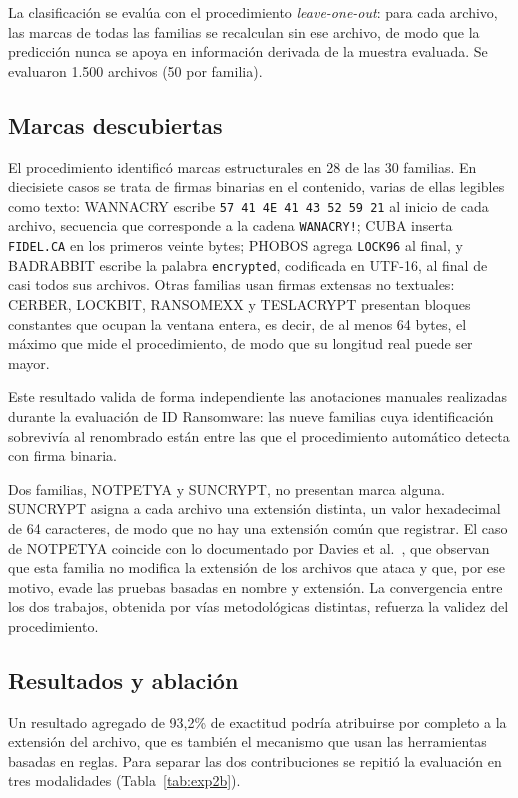 La clasificación se evalúa con el procedimiento \textit{leave-one-out}: para cada archivo, las marcas de todas las familias se recalculan sin ese archivo, de modo que la predicción nunca se apoya en información derivada de la muestra evaluada. Se evaluaron 1.500 archivos (50 por familia).

\subsection{Marcas descubiertas}

El procedimiento identificó marcas estructurales en 28 de las 30 familias. En diecisiete casos se trata de firmas binarias en el contenido, varias de ellas legibles como texto: WANNACRY escribe \texttt{57 41 4E 41 43 52 59 21} al inicio de cada archivo, secuencia que corresponde a la cadena \texttt{WANACRY!}; CUBA inserta \texttt{FIDEL.CA} en los primeros veinte bytes; PHOBOS agrega \texttt{LOCK96} al final, y BADRABBIT escribe la palabra \texttt{encrypted}, codificada en UTF-16, al final de casi todos sus archivos. Otras familias usan firmas extensas no textuales: CERBER, LOCKBIT, RANSOMEXX y TESLACRYPT presentan bloques constantes que ocupan la ventana entera, es decir, de al menos 64 bytes, el máximo que mide el procedimiento, de modo que su longitud real puede ser mayor.

Este resultado valida de forma independiente las anotaciones manuales realizadas durante la evaluación de ID Ransomware: las nueve familias cuya identificación sobrevivía al renombrado están entre las que el procedimiento automático detecta con firma binaria.

Dos familias, NOTPETYA y SUNCRYPT, no presentan marca alguna. SUNCRYPT asigna a cada archivo una extensión distinta, un valor hexadecimal de 64 caracteres, de modo que no hay una extensión común que registrar. El caso de NOTPETYA coincide con lo documentado por Davies et al.~\cite{davies2023majority}, que observan que esta familia no modifica la extensión de los archivos que ataca y que, por ese motivo, evade las pruebas basadas en nombre y extensión. La convergencia entre los dos trabajos, obtenida por vías metodológicas distintas, refuerza la validez del procedimiento.

\subsection{Resultados y ablación}

Un resultado agregado de 93,2\% de exactitud podría atribuirse por completo a la extensión del archivo, que es también el mecanismo que usan las herramientas basadas en reglas. Para separar las dos contribuciones se repitió la evaluación en tres modalidades (Tabla~\ref{tab:exp2b}).

